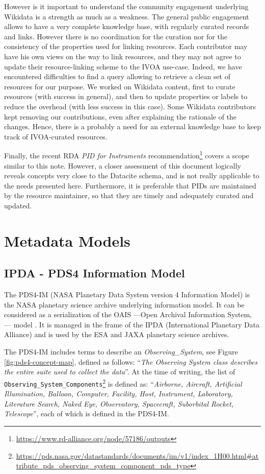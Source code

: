 \documentclass[11pt,a4paper]{ivoa}
\begin{document}
However is it important to understand the community engagement
underlying Wikidata is a strength as much as a weakness. The
general public engagement allows to have a very complete
knowledge base, with regularly curated records and links. However
there is no coordination for the curation nor for the consistency
of the properties used for linking resources. Each contributor may
have his own views on the way to link resources, and they may not
agree to update their resource-linking scheme to the IVOA use-case.
Indeed, we have encountered difficulties to find a query allowing
to retrieve a clean set of resources for our purpose. We worked on
Wikidata content, first to curate resources (with success in general),
and then to update properties or labels to reduce the overhead (with
less success in this case). Some Wikidata contributors kept removing
our contributions, even after explaining the rationale of the changes.
Hence, there is a probably a need for an external knowledge base to
keep track of IVOA-curated resources.

Finally, the recent RDA \emph{PID for Instruments}
recommendation\footnote{\url{https://www.rd-alliance.org/node/57186/outputs}}
covers a scope similar to this note. However, a closer
assessment of this document logically reveals concepts very
close to the Datacite schema, and is not really applicable to
the needs presented here. Furthermore, it is preferable that
PIDs are maintained by the resource maintainer, so that they
are timely and adequately curated and updated.

\appendix
\section{Metadata Models}
\label{appendix:models}

\subsection{IPDA - PDS4 Information Model}
The PDS4-IM (NASA Planetary Data System version 4 Information Model)
is the NASA planetary science archive underlying information
model. It can be considered as a serialization of the OAIS ---Open
Archival Information System, \citep{iso:oais}--- model \citep{Hughes:2017bt}.
It is managed in the frame of the IPDA (International Planetary
Data Alliance) and is used by the ESA and JAXA planetary science
archives.

The PDS4-IM includes terms to describe an \emph{Observing\_System}, see
Figure \ref{fig:pds4-concept-map}, defined as follows:
``\emph{The Observing System class describes the entire suite used to
collect the data}''. At the time of writing, the list of
\texttt{Observing\_System\_Components}\footnote{
\url{https://pds.nasa.gov/datastandards/documents/im/v1/index_1H00.html\#attribute_pds_observing_system_component_pds_type}}
is defined as: ``\emph{Airborne, Aircraft, Artificial Illumination,
Balloon, Computer, Facility, Host, Instrument, Laboratory, Literature
Search, Naked Eye, Observatory, Spacecraft, Suborbital Rocket,
Telescope}'', each of which is defined in the PDS4-IM.
\end{document}

